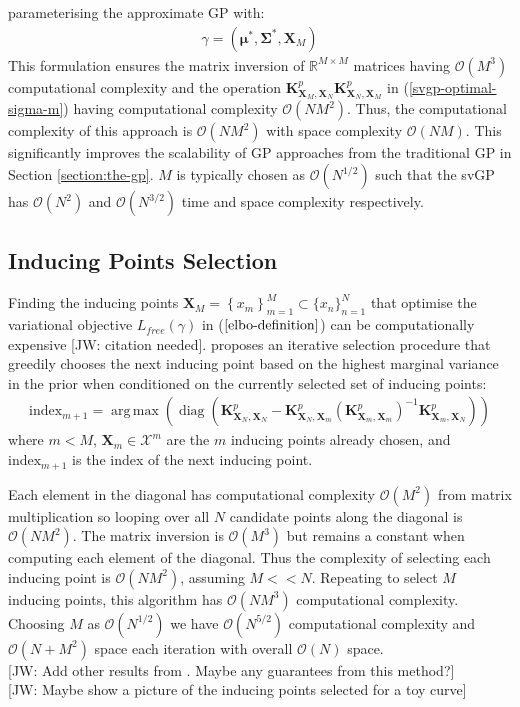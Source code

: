 \documentclass{article}
\newcommand{\jw}[1]{{\color{gray} [JW: #1]}}
\newcommand{\diag}{\operatorname{diag}}
\DeclareMathOperator*{\argmax}{arg\,max}
\numberwithin{equation}{section}
\begin{document}
parameterising the approximate GP with:
\begin{align}
    \gamma = \left(\boldsymbol{\mu}^*, \mathbf{\Sigma}^*,  \mathbf{X}_M\right)
    \label{titsias-svgp-parameters}
\end{align}
This formulation ensures the matrix inversion of $\mathbb{R}^{M \times M}$ matrices having $\mathcal{O}\left(M^3\right)$ computational complexity and the operation $\mathbf{K}^p_{\mathbf{X}_M, \mathbf{X}_N} \mathbf{K}^p_{\mathbf{X}_N, \mathbf{X}_M} $ in (\ref{svgp-optimal-sigma-m}) having computational complexity $\mathcal{O}\left(NM^2\right)$. Thus, the computational complexity of this approach is $\mathcal{O}\left(NM^2\right)$ with space complexity $\mathcal{O}\left(NM\right)$. This significantly improves the scalability of GP approaches from the traditional GP in Section \ref{section:the-gp}. $M$ is typically chosen as $\mathcal{O}(N^{1/2})$ such that the svGP has $\mathcal{O}(N^{2})$ and $\mathcal{O}(N^{3/2})$ time and space complexity respectively.

\subsection{Inducing Points Selection}\label{section:inducing-point-selection}
Finding the inducing points $\mathbf{X}_M = \left\{x_m\right\}_{m=1}^{M} \subset \{x_n\}_{n=1}^{N}$ that optimise the variational objective $L_{free}(\gamma)$ in ($\ref{elbo-definition}$) can be computationally expensive \jw{citation needed}. \cite{burt2020convergence} proposes an iterative selection procedure that greedily chooses the next inducing point based on the highest marginal variance in the prior when conditioned on the currently selected set of inducing points:
\begin{align}
    \label{greedy-varaince-selection}
    \text{index}_{m+1} = \argmax \left(\diag \left(\mathbf{K}^p_{\mathbf{X}_N, \mathbf{X}_N} - \mathbf{K}^p_{\mathbf{X}_N, \mathbf{X}_{m}} \left(\mathbf{K}^p_{\mathbf{X}_{m}, \mathbf{X}_{m}}\right)^{-1}\mathbf{K}^p_{\mathbf{X}_{m}, \mathbf{X}_N}\right)\right)
\end{align}
where $m < M$, $\mathbf{X}_{m} \in \mathcal{X}^m$ are the $m$ inducing points already chosen, and $\text{index}_{m+1}$ is the index of the next inducing point.

Each element in the diagonal has computational complexity $\mathcal{O}(M^2)$ from matrix multiplication so looping over all $N$ candidate points along the diagonal is $\mathcal{O}(NM^2)$. The matrix inversion is $\mathcal{O}(M^3)$ but remains a constant when computing each element of the diagonal. Thus the complexity of selecting each inducing point is $\mathcal{O}(NM^2)$, assuming $M << N$. Repeating to select $M$ inducing points, this algorithm has $\mathcal{O}(NM^3)$ computational complexity. Choosing $M$ as $\mathcal{O}(N^{1/2})$ we have $\mathcal{O}(N^{5/2})$ computational complexity and $\mathcal{O}(N + M^2)$ space each iteration with overall $\mathcal{O}(N)$ space. 
\\\jw{Add other results from \cite{burt2020convergence}. Maybe any guarantees from this method?}
\\\jw{Maybe show a picture of the inducing points selected for a toy curve}
\end{document}

